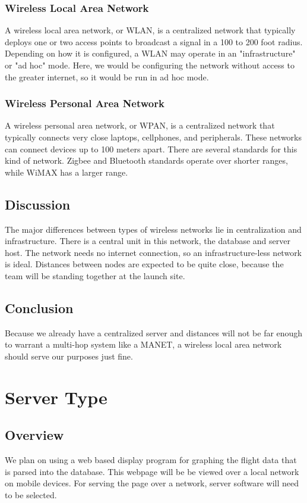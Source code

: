 \documentclass[onecolumn, draftclsnofoot,10pt, compsoc]{IEEEtran}
\begin{document}
\subsubsection{Wireless Local Area Network}
A wireless local area network, or WLAN, is a centralized network that typically deploys one or two access points to broadcast a signal in a 100 to 200 foot radius.\cite{2} 
Depending on how it is configured, a WLAN may operate in an "infrastructure" or "ad hoc" mode.\cite{5} 
Here, we would be configuring the network without access to the greater internet, so it would be run in ad hoc mode.


\subsubsection{Wireless Personal Area Network}
A wireless personal area network, or WPAN, is a centralized network that typically connects very close laptops, cellphones, and peripherals.
These networks can connect devices up to 100 meters apart.
There are several standards for this kind of network.
Zigbee and Bluetooth standards operate over shorter ranges, while WiMAX has a larger range. \cite{5}


\subsection{Discussion}
The major differences between types of wireless networks lie in centralization and infrastructure.
There is a central unit in this network, the database and server host.
The network needs no internet connection, so an infrastructure-less network is ideal.
Distances between nodes are expected to be quite close, because the team will be standing together at the launch site.

\subsection{Conclusion}
Because we already have a centralized server and distances will not be far enough to warrant a multi-hop system like a MANET, a wireless local area network should serve our purposes just fine.


\section{Server Type}

\subsection{Overview}
We plan on using a web based display program for graphing the flight data that is parsed into the database.
This webpage will be be viewed over a local network on mobile devices.
For serving the page over a network, server software will need to be selected.
\end{document}
